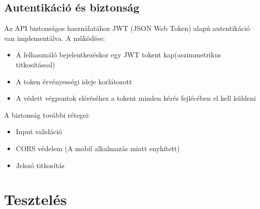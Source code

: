 \documentclass[12pt]{report}
\begin{document}
\section{Autentikáció és biztonság}
Az API biztonságos használatához JWT (JSON Web Token) alapú autentikáció van implementálva. A működése:
\begin{itemize}
  \item A felhasználó bejelentkezéskor egy JWT tokent kap(aszimmetrikus titkosítással)
  \item A token érvényességi ideje korlátozott
  \item A védett végpontok eléréséhez a tokent minden kérés fejlécében el kell küldeni
\end{itemize}

A biztonság további rétegei:
\begin{itemize}
  \item Input validáció
  \item CORS védelem (A mobil alkalmazás miatt enyhített)
  \item Jelszó titkosítás
\end{itemize}

\chapter{Tesztelés}
\end{document}
